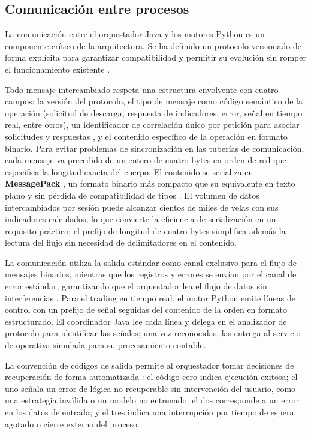 \subsection{Comunicación entre procesos}
\label{sec:ipc}

La comunicación entre el orquestador Java y los motores Python es un componente crítico de la arquitectura. Se ha definido un protocolo versionado de forma explícita para garantizar compatibilidad y permitir su evolución sin romper el funcionamiento existente \parencite{richards_software_2022}.

Todo mensaje intercambiado respeta una estructura envolvente con cuatro campos: la versión del protocolo, el tipo de mensaje como código semántico de la operación (solicitud de descarga, respuesta de indicadores, error, señal en tiempo real, entre otros), un identificador de correlación único por petición para asociar solicitudes y respuestas \parencite{hohpe_enterprise_2003}, y el contenido específico de la operación en formato binario. Para evitar problemas de sincronización en las tuberías de comunicación, cada mensaje va precedido de un entero de cuatro bytes en orden de red que especifica la longitud exacta del cuerpo. El contenido se serializa en \textbf{MessagePack} \parencite{furuhashi_msgpack_2013}, un formato binario más compacto que su equivalente en texto plano y sin pérdida de compatibilidad de tipos \parencite{kleppmann_designing_2017}. El volumen de datos intercambiados por sesión puede alcanzar cientos de miles de velas con sus indicadores calculados, lo que convierte la eficiencia de serialización en un requisito práctico; el prefijo de longitud de cuatro bytes simplifica además la lectura del flujo sin necesidad de delimitadores en el contenido.

La comunicación utiliza la salida estándar como canal exclusivo para el flujo de mensajes binarios, mientras que los registros y errores se envían por el canal de error estándar, garantizando que el orquestador lea el flujo de datos sin interferencias \parencite{newman_building_2015}. Para el trading en tiempo real, el motor Python emite líneas de control con un prefijo de señal seguidas del contenido de la orden en formato estructurado. El coordinador Java lee cada línea y delega en el analizador de protocolo para identificar las señales; una vez reconocidas, las entrega al servicio de operativa simulada para su procesamiento contable.

La convención de códigos de salida permite al orquestador tomar decisiones de recuperación de forma automatizada \parencite{richards_software_2022}: el código cero indica ejecución exitosa; el uno señala un error de lógica no recuperable sin intervención del usuario, como una estrategia inválida o un modelo no entrenado; el dos corresponde a un error en los datos de entrada; y el tres indica una interrupción por tiempo de espera agotado o cierre externo del proceso.

